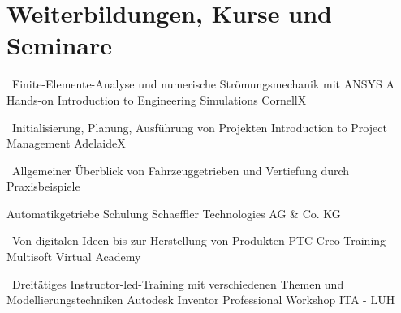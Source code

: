 \documentclass[11pt,a4paper,sans]{moderncv}
\begin{document}


\section{\textbf{Weiterbildungen, Kurse und Seminare}}

{\ Finite-Elemente-Analyse und numerische Strömungsmechanik mit ANSYS}
{A Hands-on Introduction to Engineering Simulations}
{CornellX}
{}
{}


{\ Initialisierung, Planung, Ausführung von Projekten}
{Introduction to Project Management}
{AdelaideX}
{}
{}


{
\parbox[t]{10cm}{\ Allgemeiner Überblick von Fahrzeuggetrieben und Vertiefung durch Praxisbeispiele}
}
{Automatikgetriebe Schulung}
{Schaeffler Technologies AG \& Co. KG}
{}
{}


{\ Von digitalen Ideen bis zur Herstellung von Produkten}
{PTC Creo Training}
{Multisoft Virtual Academy}
{}
{}



{\ Dreitätiges Instructor-led-Training mit verschiedenen Themen und Modellierungstechniken}
{Autodesk Inventor Professional Workshop}
{ITA - LUH}
{}
{}



\end{document}

